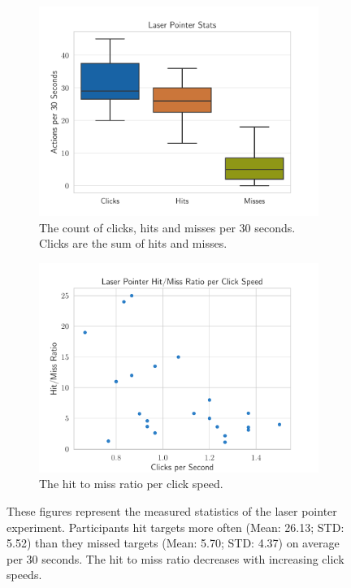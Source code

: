\begin{figure}[H]
	\centering
	\begin{subfigure}[t]{.48\linewidth}%
		\centering
		\includegraphics[width=\linewidth]{figures/evaluation/eval_exp_lp.pdf}
		\caption{The count of clicks, hits and misses per 30 seconds. Clicks are the sum of hits and misses.}\label{fig:eval-exp-lp}
	\end{subfigure}%
	\hspace{0.02\linewidth}%
	\begin{subfigure}[t]{.48\linewidth}%
		\centering
		\includegraphics[width=\linewidth]{figures/evaluation/eval_exp_lp_ratio_scatter.pdf}
		\caption{The hit to miss ratio per click speed.}\label{fig:eval-exp-lp-ratio-scatter} %
	\end{subfigure}%
	\caption[Laser pointer task results]{These figures represent the measured statistics of the laser pointer experiment. Participants hit targets more often (Mean: 26.13; \gls{STD}: 5.52) than they missed targets (Mean: 5.70; \gls{STD}: 4.37) on average per 30 seconds. The hit to miss ratio decreases with increasing click speeds.}\label{fig:exp-lp-eval}
\end{figure}

